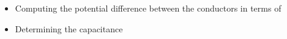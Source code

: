 \begin{ELexample}{}
\begin{ELsolution}

\begin{itemize}
\tightlist
\item
  Computing the potential difference between the conductors in terms of 
\end{itemize}


\begin{itemize}
\tightlist
\item
  Determining the capacitance
\end{itemize}


\end{ELsolution}

\end{ELexample}

\ELhold


